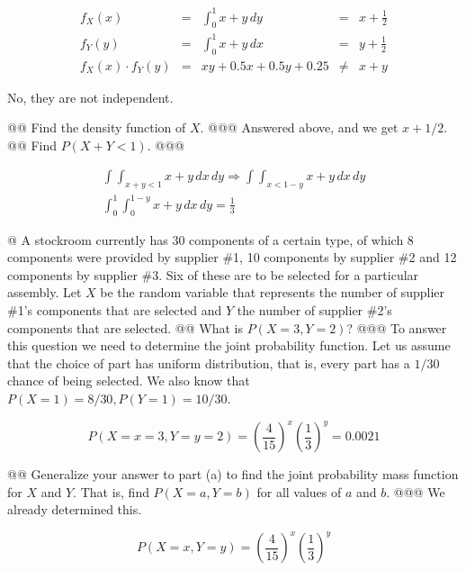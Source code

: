 \documentclass[11pt]{article}\usepackage[]{graphicx}\usepackage[]{xcolor}
\begin{document}
\begin{easylist}[enumerate]
    \[
        \begin{aligned}
            f_X(x) &=& \int_0^1 x + y \, dy &=& x + \frac{1}{2}\\
            f_Y(y) &=& \int_0^1 x + y \, dx &=& y + \frac{1}{2}\\
            f_X(x) \cdot f_Y(y) &=& x y+0.5 x+0.5 y+0.25 &\neq& x + y
        \end{aligned}
    \]

    No, they are not independent.

    @@ Find the density function of $X$.
    @@@ Answered above, and we get $x + 1/2$.
    @@ Find $P(X + Y < 1)$.
    @@@

    \[
        \begin{aligned}
            \int\int_{x + y < 1} x + y \, dx \, dy \Rightarrow \int\int_{x < 1 - y} x + y \, dx \, dy\\
            \int_0^1 \int_0^{1 - y} x + y \, dx \, dy = \boxed{\frac{1}{3}}
        \end{aligned}
    \]

    @ A stockroom currently has 30 components of a certain type, of which 8 components were provided by supplier \#1, 10
    components by supplier \#2 and 12 components by supplier \#3. Six of these are to be selected for a particular
    assembly. Let $X$ be the random variable that represents the number of supplier \#1's components that are selected
    and $Y$ the number of supplier \#2's components that are selected.
    @@ What is $P(X = 3, Y = 2)$?
    @@@ To answer this question we need to determine the joint probability function. Let us assume that the choice of
    part has uniform distribution, that is, every part has a $1/30$ chance of being selected. We also know that
    $P(X=1)=8/30, P(Y=1)=10/30$.




    \[
        P(X=x=3, Y=y=2) = {\left( \frac{4}{15} \right)}^x { \left( \frac{1}{3} \right)}^y = 0.0021
    \]

    @@ Generalize your answer to part (a) to find the joint probability mass function for $X$ and $Y$.  That is, find
    $P(X = a, Y = b)$ for all values of $a$ and $b$.
    @@@ We already determined this.

    \[
        P(X=x, Y=y) = {\left( \frac{4}{15} \right)}^x { \left( \frac{1}{3} \right)}^y
    \]


\end{easylist}
\end{document}
